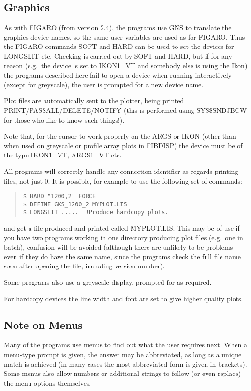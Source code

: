 \subsection{Graphics}

As with FIGARO (from version 2.4), the programs use GNS to translate the
graphics device names, so the same user variables are used as for
FIGARO.
Thus the FIGARO commands SOFT and HARD can be used to set the devices
for LONGSLIT etc.
Checking is carried out by SOFT and HARD, but if for any reason
(e.g.\ the device is set to IKON1\_VT and somebody else is using the
Ikon) the programs described here fail to open a device when running
interactively (except for greyscale), the user is prompted for a new
device name.

Plot files are automatically sent to the plotter, being printed
PRINT/PASSALL/DELETE/NOTIFY (this is performed using SYS\$SNDJBCW for
those who like to know such things!).

Note that, for the cursor to work properly on the ARGS or IKON (other
than when used on greyscale or profile array plots in FIBDISP) the
device must be of the type IKON1\_VT, ARGS1\_VT etc.

All programs will correctly handle any connection identifier as regards
printing files, not just 0.
It is possible, for example to use the following set of commands:
\begin{quote}\begin{verbatim}
$ HARD "1200,2" FORCE
$ DEFINE GKS_1200_2 MYPLOT.LIS
$ LONGSLIT .....  !Produce hardcopy plots.
\end{verbatim}\end{quote}
 and get a file produced and printed called MYPLOT.LIS.
This may be of use if you have two programs working in one directory
producing plot files (e.g.\ one in batch), confusion will be avoided
(although there are unlikely to be problems even if they do have the
same name, since the programs check the full file name soon after
opening the file, including version number).

Some programs also use a greyscale display, prompted for as required.

For hardcopy devices the line width and font are set to give higher
quality plots.

\subsection{Note on Menus}

Many of the programs use menus to find out what the user requires next.
When a menu-type prompt is given, the answer may be abbreviated, as long
as a unique match is achieved (in many cases the most abbreviated form
is given in brackets).
Some menus also allow numbers or additional strings to follow (or even
replace) the menu options themselves.

